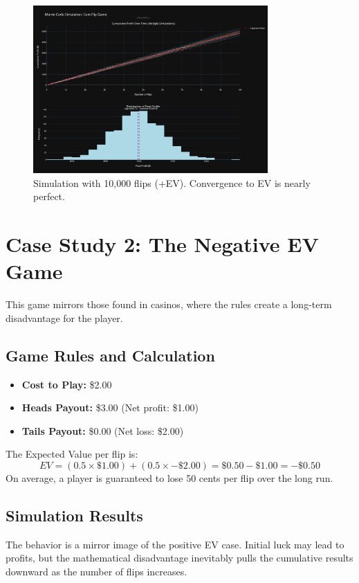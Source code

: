 \documentclass[12pt]{article}
\begin{document}
\begin{figure}[h!]
\centering
\includegraphics[width=0.8\textwidth]{+ev/10k+ev.png}
\caption{Simulation with 10,000 flips (+EV). Convergence to EV is nearly perfect.}
\end{figure}

\section{Case Study 2: The Negative EV Game}
This game mirrors those found in casinos, where the rules create a long-term disadvantage for the player.

\subsection{Game Rules and Calculation}
\begin{itemize}
    \item \textbf{Cost to Play:} \$2.00
    \item \textbf{Heads Payout:} \$3.00 (Net profit: \$1.00)
    \item \textbf{Tails Payout:} \$0.00 (Net loss: \$2.00)
\end{itemize}
The Expected Value per flip is:
\[
EV = (0.5 \times \$1.00) + (0.5 \times -\$2.00) = \$0.50 - \$1.00 = \boldsymbol{-\$0.50}
\]
On average, a player is guaranteed to lose 50 cents per flip over the long run.

\subsection{Simulation Results}
The behavior is a mirror image of the positive EV case. Initial luck may lead to profits, but the mathematical disadvantage inevitably pulls the cumulative results downward as the number of flips increases.
\end{document}
